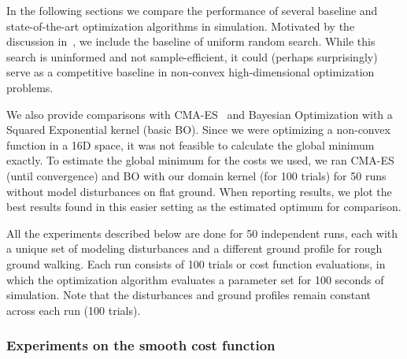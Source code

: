 In the following sections we compare the performance of several baseline and state-of-the-art optimization algorithms in simulation. Motivated by the discussion in~\cite{calandra2016bayesian}, we include the baseline of uniform random search. While this search is uninformed and not sample-efficient, it could (perhaps surprisingly) serve as a competitive baseline in non-convex high-dimensional optimization problems. 

We also provide comparisons with \mbox{CMA-ES}~\cite{hansen2006cma} and Bayesian Optimization with a Squared Exponential kernel (basic BO). Since we were optimizing a non-convex function in a 16D space, it was not feasible to calculate the global minimum exactly. To estimate the global minimum for the costs we used, we ran CMA-ES (until convergence) and BO with our domain kernel (for 100 trials) for 50 runs without model disturbances on flat ground. 
When reporting results, we plot the best results found in this easier setting as the estimated optimum for comparison.

All the experiments described below are done for 50 independent runs, each with a unique set of modeling disturbances and a different ground profile for rough ground walking. Each run  consists of 100 trials or cost function evaluations, in which the optimization algorithm evaluates a parameter set for 100 seconds of simulation. Note that the disturbances and ground profiles remain constant across each run (100 trials).

\subsubsection{Experiments on the smooth cost function}

